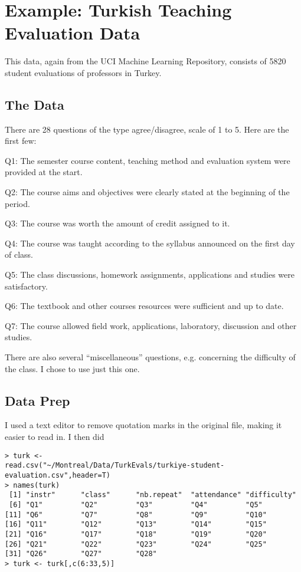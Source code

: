 \section{Example:  Turkish Teaching Evaluation Data}
\label{turk0}

This data, again from the UCI Machine Learning Repository, consists
of 5820 student evaluations of professors in Turkey.  

\subsection{The Data}

There are 28 questions of the type agree/disagree, scale of 1 to 5.
Here are the first few:

Q1: The semester course content, teaching method and evaluation system
were provided at the start.

Q2: The course aims and objectives were clearly stated at the beginning
of the period.

Q3: The course was worth the amount of credit assigned to it.

Q4: The course was taught according to the syllabus announced on the
first day of class.

Q5: The class discussions, homework assignments, applications and
studies were satisfactory.

Q6: The textbook and other courses resources were sufficient and up to
date.

Q7: The course allowed field work, applications, laboratory, discussion
and other studies.

There are also several ``miscellaneous'' questions, e.g. concerning the
difficulty of the class.  I chose to use just this one.

\subsection{Data Prep}

I used a text editor to remove quotation marks in the original file,
making it easier to read in.  I then did

\begin{lstlisting}
> turk <-
read.csv("~/Montreal/Data/TurkEvals/turkiye-student-evaluation.csv",header=T)
> names(turk)
 [1] "instr"      "class"      "nb.repeat"  "attendance" "difficulty"
 [6] "Q1"         "Q2"         "Q3"         "Q4"         "Q5"        
[11] "Q6"         "Q7"         "Q8"         "Q9"         "Q10"       
[16] "Q11"        "Q12"        "Q13"        "Q14"        "Q15"       
[21] "Q16"        "Q17"        "Q18"        "Q19"        "Q20"       
[26] "Q21"        "Q22"        "Q23"        "Q24"        "Q25"       
[31] "Q26"        "Q27"        "Q28"       
> turk <- turk[,c(6:33,5)]
\end{lstlisting}

